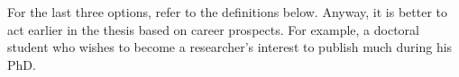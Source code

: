 For the last three options, refer to the definitions below.
Anyway, it is better to act earlier in the thesis based on career prospects.
For example, a doctoral student who wishes to become a researcher's interest to publish much during his PhD.
%
%

